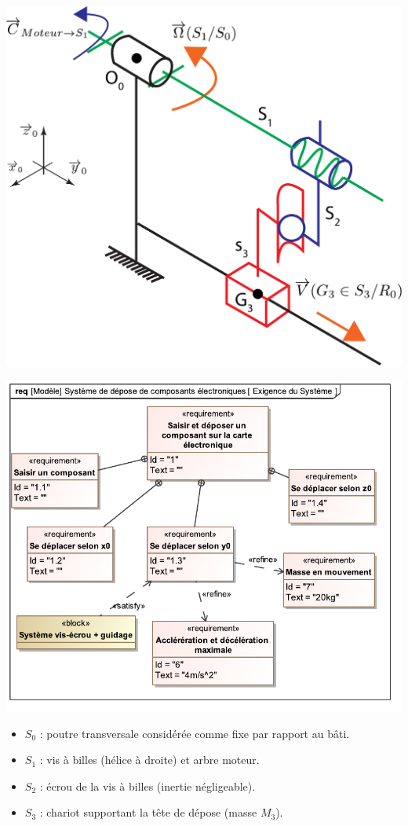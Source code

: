 \documentclass[10pt,fleqn]{article} %
\begin{document}
\begin{multicols}{2}
\begin{center}
\includegraphics[width=\linewidth]{images/schema_cine_depose_composant.pdf}

\includegraphics[width=\linewidth]{images/req_systeme_depose.pdf}
\end{center}
\begin{itemize}
\item $S_0$ : poutre transversale considérée comme fixe par rapport au bâti.
\item $S_1$ : vis à billes (hélice à droite) et arbre moteur.
\item $S_2$ : écrou de la vis à billes (inertie négligeable).
\item $S_3$ : chariot supportant la tête de dépose (masse $M_3$).
\end{itemize}


\end{multicols}
\end{document}
